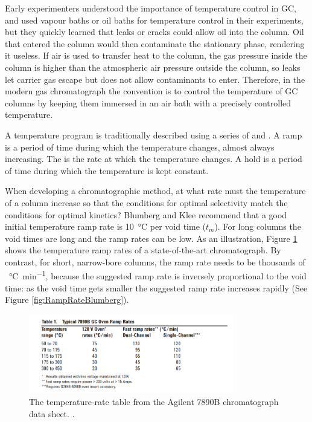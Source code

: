 Early experimenters understood the importance of temperature control in GC, and
used vapour baths \autocite{Desty1957} or oil baths \autocite{Eggertsen1956} for
temperature control in their experiments, but they quickly learned that leaks or
cracks could allow oil into the column. Oil that entered the column would then
contaminate the stationary phase, rendering it useless.  If air is used to
transfer heat to the column, the gas pressure inside the column is higher than
the atmospheric air pressure outside the column, so leaks let carrier gas escape
but does not allow contaminants to enter. Therefore, in the modern gas
chromatograph the convention is to control the temperature of GC columns by
keeping them immersed in an air bath with a precisely controlled temperature.

A temperature program is traditionally described using a series of
 and . A ramp is a period of time during which the
temperature changes, almost always increasing. The  is the
rate at which the temperature changes. A hold is a period of time during which
the temperature is kept constant.

When developing a chromatographic method, at what rate must the temperature of a
column increase so that the conditions for optimal selectivity match the
conditions for optimal kinetics? Blumberg and Klee \autocite{Blumberg2000}
recommend that a good initial temperature ramp rate is \SI{10}{\celsius} per
void time (\(t_m\)). For long columns the void times are long and the ramp
rates can be low. As an illustration, Figure \ref{fig:RampRate7890B} shows the
temperature ramp rates of a state-of-the-art chromatograph. By contrast, for
short, narrow-bore columns, the ramp rate needs to be thousands of
\SI{}{\celsius\per\minute}, because the suggested ramp rate is inversely
proportional to the void time: as the void time gets smaller the suggested ramp
rate increases rapidly (See Figure \ref{fig:RampRateBlumberg}).

\begin{figure}
	\centering
	\includegraphics[width=0.8\textwidth]{Figures/7890B.png}
	\decoRule
	\caption[A temperature-rate table from the Agilent7890B data sheet]{The
	temperature-rate table from the Agilent 7890B chromatograph data sheet.
	\autocite{7890B}. }
	\label{fig:RampRate7890B}
\end{figure}

